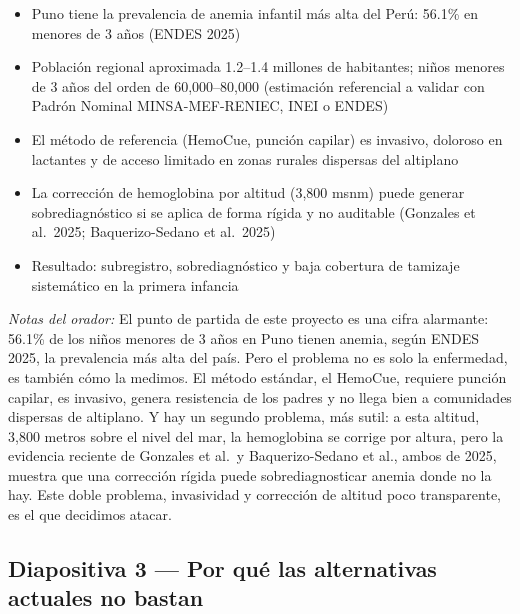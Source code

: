 \documentclass[11pt,a4paper]{article}
\providecommand{\tightlist}{%
  \setlength{\itemsep}{0pt}\setlength{\parskip}{0pt}}
\begin{document}
\begin{itemize}
\tightlist
\item
  Puno tiene la prevalencia de anemia infantil más alta del Perú: 56.1\% en menores de 3 años (ENDES 2025)
\item
  Población regional aproximada 1.2--1.4 millones de habitantes; niños menores de 3 años del orden de 60,000--80,000 (estimación referencial a validar con Padrón Nominal MINSA-MEF-RENIEC, INEI o ENDES)
\item
  El método de referencia (HemoCue, punción capilar) es invasivo, doloroso en lactantes y de acceso limitado en zonas rurales dispersas del altiplano
\item
  La corrección de hemoglobina por altitud (3,800 msnm) puede generar sobrediagnóstico si se aplica de forma rígida y no auditable (Gonzales et al.~2025; Baquerizo-Sedano et al.~2025)
\item
  Resultado: subregistro, sobrediagnóstico y baja cobertura de tamizaje sistemático en la primera infancia
\end{itemize}

\emph{Notas del orador:} El punto de partida de este proyecto es una cifra alarmante: 56.1\% de los niños menores de 3 años en Puno tienen anemia, según ENDES 2025, la prevalencia más alta del país. Pero el problema no es solo la enfermedad, es también cómo la medimos. El método estándar, el HemoCue, requiere punción capilar, es invasivo, genera resistencia de los padres y no llega bien a comunidades dispersas de altiplano. Y hay un segundo problema, más sutil: a esta altitud, 3,800 metros sobre el nivel del mar, la hemoglobina se corrige por altura, pero la evidencia reciente de Gonzales et al.~y Baquerizo-Sedano et al., ambos de 2025, muestra que una corrección rígida puede sobrediagnosticar anemia donde no la hay. Este doble problema, invasividad y corrección de altitud poco transparente, es el que decidimos atacar.

\subsection{Diapositiva 3 --- Por qué las alternativas actuales no bastan}\label{diapositiva-3-por-quuxe9-las-alternativas-actuales-no-bastan}
\end{document}
